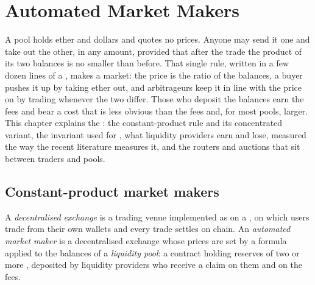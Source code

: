 \chapter{Automated Market Makers}\label{ch:m3:automated-market-makers}

A pool holds ether and dollars and quotes no prices. Anyone may send it one  and take out the
other, in any amount, provided that after the trade the product of its two balances is no smaller than
before. That single rule, written in a few dozen lines of a , makes a market: the price is
the ratio of the balances, a buyer pushes it up by taking ether out, and arbitrageurs keep it in line
with the price on  by trading whenever the two differ. Those who deposit the
balances earn the fees and bear a cost that is less obvious than the fees and, for most pools, larger.
This chapter explains the : the constant-product rule and its concentrated
variant, the invariant used for , what liquidity providers earn and lose, measured the way
the recent literature measures it, and the routers and auctions that sit between traders and pools.

\section{Constant-product market makers}

\begin{definition}\label{def:m3:automated-market-makers:amm}
A \emph{decentralised exchange} is a trading venue implemented as  on a , on which users trade from their own wallets and every trade settles on chain.
An \emph{automated market maker} is a decentralised exchange whose prices are
set by a formula applied to the balances of a \emph{liquidity pool}: a contract holding
reserves of two or more , deposited by liquidity providers who receive a claim on them and on the fees.
\end{definition}

